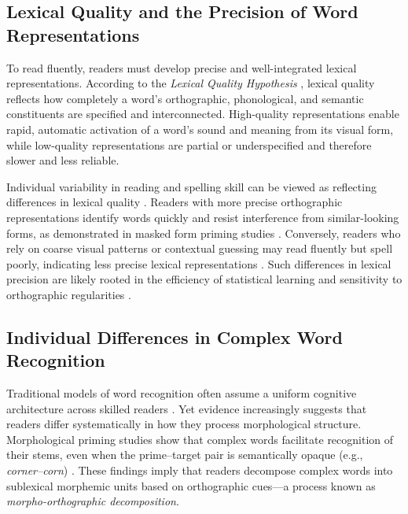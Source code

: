 \documentclass[preprint,12pt, authoryear, review]{elsarticle}
\begin{document}
\subsection{Lexical Quality and the Precision of Word Representations}

To read fluently, readers must develop precise and well-integrated lexical representations. According to the \textit{Lexical Quality Hypothesis} \citep{perfettiLexicalQualityHypothesis2002, perfettiReadingAbilityLexical2007, perfettiLexicalQualityRevisited2017}, lexical quality reflects how completely a word’s orthographic, phonological, and semantic constituents are specified and interconnected. High-quality representations enable rapid, automatic activation of a word’s sound and meaning from its visual form, while low-quality representations are partial or underspecified and therefore slower and less reliable.

Individual variability in reading and spelling skill can be viewed as reflecting differences in lexical quality \citep{andrewsLexicalExpertiseReading2009, andrewsLexicalPrecisionSkilled2010, andrewsIndividualDifferencesSkilled2012}. Readers with more precise orthographic representations identify words quickly and resist interference from similar-looking forms, as demonstrated in masked form priming studies \citep{forsterRepetitionPrimingFrequency1984, andrewsLexicalPrecisionSkilled2010}. Conversely, readers who rely on coarse visual patterns or contextual guessing may read fluently but spell poorly, indicating less precise lexical representations \citep{frithSurfaceDevelopmentalDyslexia2017}. Such differences in lexical precision are likely rooted in the efficiency of statistical learning and sensitivity to orthographic regularities \citep{sharePhonologicalRecodingSelfteaching1995}.

\subsection{Individual Differences in Complex Word Recognition}

Traditional models of word recognition often assume a uniform cognitive architecture across skilled readers \citep{cronbachTwoDisciplinesScientific1957}. Yet evidence increasingly suggests that readers differ systematically in how they process morphological structure. Morphological priming studies show that complex words facilitate recognition of their stems, even when the prime–target pair is semantically opaque (e.g., \textit{corner–corn}) \citep{rastleBrothMyBrother2004, rastleMorphologicalDecompositionBased2008}. These findings imply that readers decompose complex words into sublexical morphemic units based on orthographic cues—a process known as \textit{morpho-orthographic decomposition}. 
\end{document}
